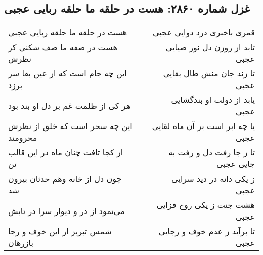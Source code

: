 \begin{center}
\section*{غزل شماره ۲۸۶۰: هست در حلقه ما حلقه ربایی عجبی}
\label{sec:2860}
\begin{longtable}{l p{0.5cm} r}
هست در حلقه ما حلقه ربایی عجبی
&&
قمری باخبری درد دوایی عجبی
\\
هست در صفه ما صف شکنی کز نظرش
&&
تابد از روزن دل نور ضیایی عجبی
\\
این چه جام است که از عین بقا سر برزد
&&
تا زند جان منش طال بقایی عجبی
\\
هر کی از ظلمت غم بر دل او بند بود
&&
یابد از دولت او بندگشایی عجبی
\\
این چه سحر است که خلق از نظرش محرومند
&&
یا چه ابر است بر آن ماه لقایی عجبی
\\
از کجا تافت چنان ماه در این قالب تن
&&
تا ز جا رفت دل و رفت به جایی عجبی
\\
چون دل از خانه وهم حدثان بیرون شد
&&
ز یکی دانه در دید سرایی عجبی
\\
می‌نمود از در و دیوار سرا در تابش
&&
هشت جنت ز یکی روح فزایی عجبی
\\
شمس تبریز از این خوف و رجا بازرهان
&&
تا برآید ز عدم خوف و رجایی عجبی
\\
\end{longtable}
\end{center}

